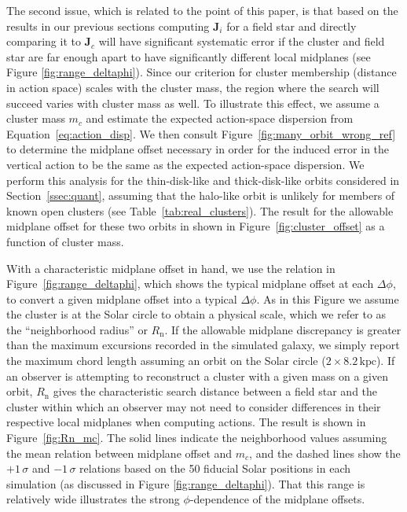 \documentclass[twocolumn]{aastex62}
\newcommand{\kpc}{\text{kpc}}
\newcommand{\n}{\text{n}}
\begin{document}
The second issue, which is related to the point of this paper, is that based
on the results in our previous sections computing $\bm{J}_i$ for a field star
and directly comparing it to  $\bm{J}_c$ will have significant systematic
error if the cluster and field star are far enough apart to have significantly
different local midplanes (see Figure \ref{fig:range_deltaphi}). Since our
criterion for cluster membership (distance in action space) scales with the
cluster mass, the region where the search will succeed varies with cluster
mass as well. To illustrate this effect, we assume a cluster mass $m_c$ and
estimate the expected action-space dispersion from
Equation~\ref{eq:action_disp}. We then consult
Figure~\ref{fig:many_orbit_wrong_ref} to determine the midplane offset
necessary in order for the induced error in the vertical action to be the same
as the expected action-space dispersion. We perform this analysis for the
thin-disk-like and thick-disk-like orbits considered in
Section~\ref{ssec:quant}, assuming that the halo-like orbit is unlikely for
members of known open clusters (see Table~\ref{tab:real_clusters}). The result
for the allowable midplane offset for these two orbits in shown in
Figure~\ref{fig:cluster_offset} as a function of cluster mass.

With a characteristic midplane offset in hand, we use the relation in
Figure~\ref{fig:range_deltaphi}, which shows the typical midplane offset at
each $\Delta \phi$, to convert a given midplane offset into a typical
$\Delta\phi$. As in this Figure we assume the cluster is at the Solar circle
to obtain a physical scale, which we refer to as the ``neighborhood radius''
or $R_{\n}$. If the allowable midplane discrepancy is greater than the maximum
excursions recorded in the simulated galaxy, we simply report the maximum
chord length assuming an orbit on the Solar circle ($2\times8.2\,\kpc$). If an
observer is attempting to reconstruct a cluster with a given mass on a given
orbit, $R_{\n}$ gives the characteristic search distance between a field star
and the cluster within which an observer may not need to consider differences
in their respective local midplanes when computing actions. The result is
shown in Figure~\ref{fig:Rn_mc}. The solid lines indicate the neighborhood
values assuming the mean relation between midplane offset and $m_c$, and the
dashed lines show the $+1\,\sigma$ and $-1\,\sigma$ relations based on the 50
fiducial Solar positions in each simulation (as discussed in Figure
\ref{fig:range_deltaphi}). That this range is relatively wide illustrates the
strong $\phi$-dependence of the midplane offsets.
\end{document}
